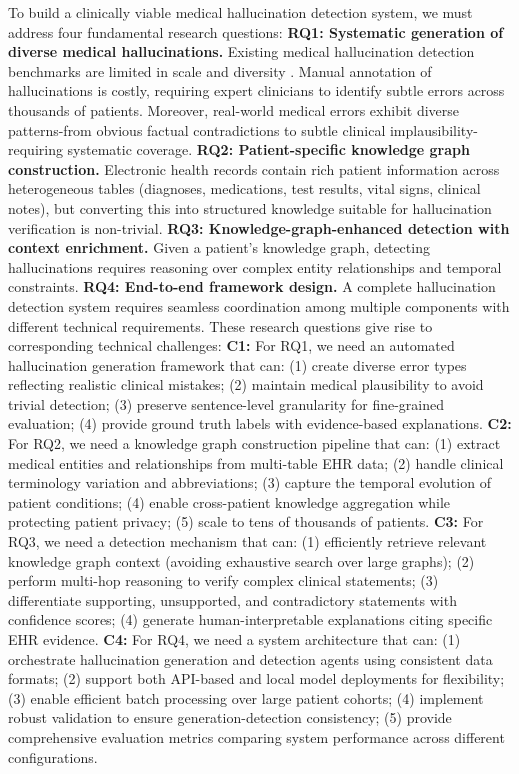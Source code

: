 \documentclass[11pt]{article}
\begin{document}
To build a clinically viable medical hallucination detection system, we must address four fundamental research questions: \textbf{RQ1: Systematic generation of diverse medical hallucinations.} Existing medical hallucination detection benchmarks are limited in scale and diversity \citep{pal2023medHalt}. Manual annotation of hallucinations is costly, requiring expert clinicians to identify subtle errors across thousands of patients. Moreover, real-world medical errors exhibit diverse patterns-from obvious factual contradictions to subtle clinical implausibility-requiring systematic coverage. \textbf{RQ2: Patient-specific knowledge graph construction.} Electronic health records contain rich patient information across heterogeneous tables (diagnoses, medications, test results, vital signs, clinical notes), but converting this into structured knowledge suitable for hallucination verification is non-trivial. \textbf{RQ3: Knowledge-graph-enhanced detection with context enrichment.} Given a patient's knowledge graph, detecting hallucinations requires reasoning over complex entity relationships and temporal constraints. \textbf{RQ4: End-to-end framework design.} A complete hallucination detection system requires seamless coordination among multiple components with different technical requirements. These research questions give rise to corresponding technical challenges: \textbf{C1:} For RQ1, we need an automated hallucination generation framework that can: (1) create diverse error types reflecting realistic clinical mistakes; (2) maintain medical plausibility to avoid trivial detection; (3) preserve sentence-level granularity for fine-grained evaluation; (4) provide ground truth labels with evidence-based explanations. \textbf{C2:} For RQ2, we need a knowledge graph construction pipeline that can: (1) extract medical entities and relationships from multi-table EHR data; (2) handle clinical terminology variation and abbreviations; (3) capture the temporal evolution of patient conditions; (4) enable cross-patient knowledge aggregation while protecting patient privacy; (5) scale to tens of thousands of patients. \textbf{C3:} For RQ3, we need a detection mechanism that can: (1) efficiently retrieve relevant knowledge graph context (avoiding exhaustive search over large graphs); (2) perform multi-hop reasoning to verify complex clinical statements; (3) differentiate supporting, unsupported, and contradictory statements with confidence scores; (4) generate human-interpretable explanations citing specific EHR evidence. \textbf{C4:} For RQ4, we need a system architecture that can: (1) orchestrate hallucination generation and detection agents using consistent data formats; (2) support both API-based and local model deployments for flexibility; (3) enable efficient batch processing over large patient cohorts; (4) implement robust validation to ensure generation-detection consistency; (5) provide comprehensive evaluation metrics comparing system performance across different configurations.
\end{document}

